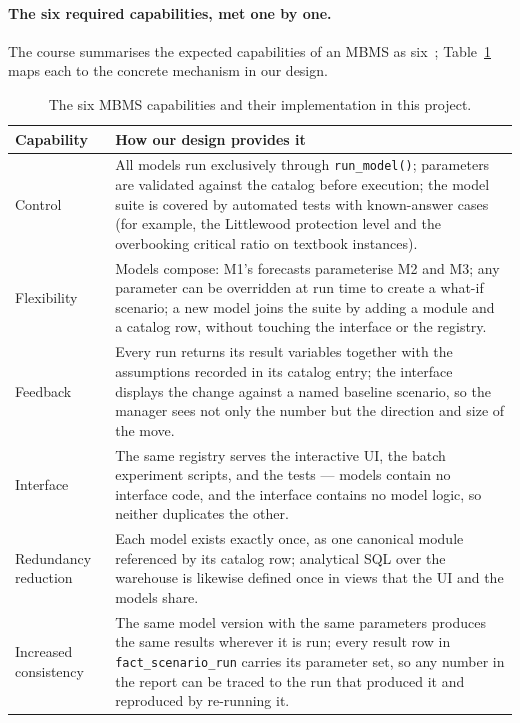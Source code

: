 \paragraph{The six required capabilities, met one by one.}
The course summarises the expected capabilities of an MBMS as six~\cite{turban2011}; Table~\ref{tab:mbmscaps} maps each to the concrete mechanism in our design.

\begin{table}[H]
\centering
\caption{The six MBMS capabilities and their implementation in this project.}
\label{tab:mbmscaps}
\begin{tabularx}{\textwidth}{@{}l X@{}}
\toprule
\textbf{Capability} & \textbf{How our design provides it} \\
\midrule
Control & All models run exclusively through \texttt{run\_model()}; parameters are validated against the catalog before execution; the model suite is covered by automated tests with known-answer cases (for example, the Littlewood protection level and the overbooking critical ratio on textbook instances). \\
Flexibility & Models compose: M1's forecasts parameterise M2 and M3; any parameter can be overridden at run time to create a what-if scenario; a new model joins the suite by adding a module and a catalog row, without touching the interface or the registry. \\
Feedback & Every run returns its result variables together with the assumptions recorded in its catalog entry; the interface displays the change against a named baseline scenario, so the manager sees not only the number but the direction and size of the move. \\
Interface & The same registry serves the interactive UI, the batch experiment scripts, and the tests --- models contain no interface code, and the interface contains no model logic, so neither duplicates the other. \\
Redundancy reduction & Each model exists exactly once, as one canonical module referenced by its catalog row; analytical SQL over the warehouse is likewise defined once in views that the UI and the models share. \\
Increased consistency & The same model version with the same parameters produces the same results wherever it is run; every result row in \texttt{fact\_scenario\_run} carries its parameter set, so any number in the report can be traced to the run that produced it and reproduced by re-running it. \\
\bottomrule
\end{tabularx}
\end{table}

